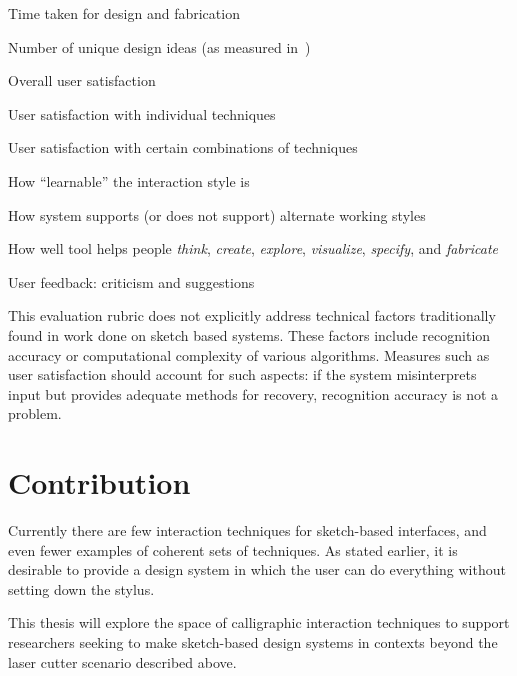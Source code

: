\documentclass[11pt]{article}
\newenvironment{packed_enum}{
\begin{enumerate}
  \setlength{\itemsep}{1pt}
  \setlength{\parskip}{0pt}
  \setlength{\parsep}{0pt}
}{\end{enumerate}}
\begin{document}
\begin{packed_enum}
\item Time taken for design and fabrication
\item Number of unique design ideas (as measured
  in~\cite{goel-sketches-of-thought})
\item Overall user satisfaction
\item User satisfaction with individual techniques
\item User satisfaction with certain combinations of techniques
\item How ``learnable'' the interaction style is
\item How system supports (or does not support) alternate working
  styles
\item How well tool helps people \textit{think}, \textit{create},
  \textit{explore}, \textit{visualize}, \textit{specify}, and
  \textit{fabricate}
\item User feedback: criticism and suggestions
\end{packed_enum}

This evaluation rubric does not explicitly address technical factors
traditionally found in work done on sketch based systems. These
factors include recognition accuracy or computational complexity of
various algorithms. Measures such as user satisfaction should account
for such aspects: if the system misinterprets input but provides
adequate methods for recovery, recognition accuracy is not a problem.

\section{Contribution}

Currently there are few interaction techniques for sketch-based
interfaces, and even fewer examples of coherent sets of techniques. As
stated earlier, it is desirable to provide a design system in which
the user can do everything without setting down the stylus.

This thesis will explore the space of calligraphic interaction
techniques to support researchers seeking to make sketch-based design
systems in contexts beyond the laser cutter scenario described above.
\end{document}
